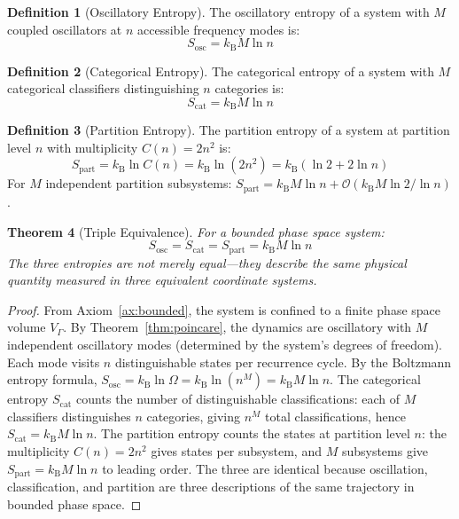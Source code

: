 \documentclass[12pt]{article}
\newtheorem{theorem}{Theorem}[section]
\theoremstyle{definition}
\newtheorem{definition}[theorem]{Definition}
\theoremstyle{remark}
\newcommand{\Sosc}{S_{\mathrm{osc}}}
\newcommand{\Scat}{S_{\mathrm{cat}}}
\newcommand{\Spart}{S_{\mathrm{part}}}
\newcommand{\kB}{k_{\mathrm{B}}}
\newcommand{\Vgamma}{V_\Gamma}
\begin{document}
\begin{definition}[Oscillatory Entropy]
\label{def:sosc}
The oscillatory entropy of a system with $M$ coupled oscillators at $n$ accessible frequency modes is:
\begin{equation}
\label{eq:sosc}
\Sosc = \kB M \ln n
\end{equation}
\end{definition}

\begin{definition}[Categorical Entropy]
\label{def:scat}
The categorical entropy of a system with $M$ categorical classifiers distinguishing $n$ categories is:
\begin{equation}
\label{eq:scat}
\Scat = \kB M \ln n
\end{equation}
\end{definition}

\begin{definition}[Partition Entropy]
\label{def:spart}
The partition entropy of a system at partition level $n$ with multiplicity $C(n) = 2n^2$ is:
\begin{equation}
\label{eq:spart}
\Spart = \kB \ln C(n) = \kB \ln(2n^2) = \kB (\ln 2 + 2 \ln n)
\end{equation}
For $M$ independent partition subsystems: $\Spart = \kB M \ln n + \mathcal{O}(\kB M \ln 2/\ln n)$.
\end{definition}

\begin{theorem}[Triple Equivalence]
\label{thm:triple}
For a bounded phase space system:
\begin{equation}
\label{eq:triple}
\Sosc = \Scat = \Spart = \kB M \ln n
\end{equation}
The three entropies are not merely equal---they describe the same physical quantity measured in three equivalent coordinate systems.
\end{theorem}

\begin{proof}
From Axiom~\ref{ax:bounded}, the system is confined to a finite phase space volume $\Vgamma$. By Theorem~\ref{thm:poincare}, the dynamics are oscillatory with $M$ independent oscillatory modes (determined by the system's degrees of freedom). Each mode visits $n$ distinguishable states per recurrence cycle. By the Boltzmann entropy formula, $\Sosc = \kB \ln \Omega = \kB \ln(n^M) = \kB M \ln n$. The categorical entropy $\Scat$ counts the number of distinguishable classifications: each of $M$ classifiers distinguishes $n$ categories, giving $n^M$ total classifications, hence $\Scat = \kB M \ln n$. The partition entropy counts the states at partition level $n$: the multiplicity $C(n) = 2n^2$ gives states per subsystem, and $M$ subsystems give $\Spart = \kB M \ln n$ to leading order. The three are identical because oscillation, classification, and partition are three descriptions of the same trajectory in bounded phase space. \qedhere
\end{proof}
\end{document}
